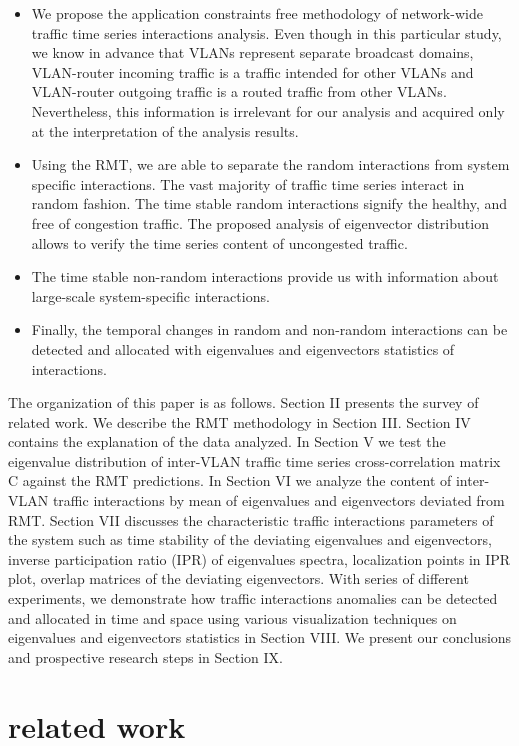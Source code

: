 \documentclass{IEEEtran}
\begin{document}
\begin{itemize}
\item We propose the application constraints free methodology of network-wide
traffic time series interactions analysis. Even though in this particular
study, we know in advance that VLANs represent separate broadcast
domains, VLAN-router incoming traffic is a traffic intended for other
VLANs and VLAN-router outgoing traffic is a routed traffic from other
VLANs. Nevertheless, this information is irrelevant for our analysis
and acquired only at the interpretation of the analysis results.
\item Using the RMT, we are able to separate the random interactions from
system specific interactions. The vast majority of traffic time series
interact in random fashion. The time stable random interactions signify
the healthy, and free of congestion traffic. The proposed analysis
of eigenvector distribution allows to verify the time series content
of uncongested traffic. 
\item The time stable non-random interactions provide us with information
about large-scale system-specific interactions.
\item Finally, the temporal changes in random and non-random interactions
can be detected and allocated with eigenvalues and eigenvectors statistics
of interactions.
\end{itemize}
The organization of this paper is as follows. Section II presents
the survey of related work. We describe the RMT methodology in Section
III. Section IV contains the explanation of the data analyzed. In
Section V we test the eigenvalue distribution of inter-VLAN traffic
time series cross-correlation matrix C against the RMT predictions.
In Section VI we analyze the content of inter-VLAN traffic interactions
by mean of eigenvalues and eigenvectors deviated from RMT. Section
VII discusses the characteristic traffic interactions parameters of
the system such as time stability of the deviating eigenvalues and
eigenvectors, inverse participation ratio (IPR) of eigenvalues spectra,
localization points in IPR plot, overlap matrices of the deviating
eigenvectors. With series of different experiments, we demonstrate
how traffic interactions anomalies can be detected and allocated in
time and space using various visualization techniques on eigenvalues
and eigenvectors statistics in Section VIII. We present our conclusions
and prospective research steps in Section IX.


\section{related work}
\end{document}
